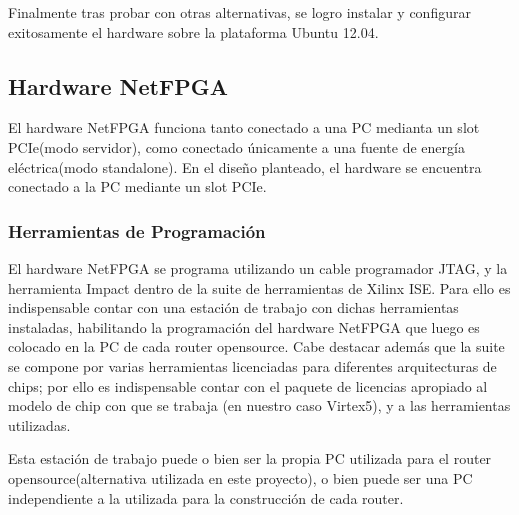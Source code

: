 Finalmente tras probar con otras alternativas, se logro instalar y configurar exitosamente el hardware sobre la plataforma Ubuntu 12.04.\\

\subsection{Hardware NetFPGA}

El hardware NetFPGA funciona tanto conectado a una PC medianta un slot PCIe(modo servidor), como conectado \'unicamente a una fuente de energ\'ia el\'ectrica(modo standalone). En el dise\~no planteado, el hardware se encuentra conectado a la PC mediante un slot PCIe.


\subsubsection{Herramientas de Programaci\'on}

El hardware NetFPGA se programa utilizando un cable programador JTAG, y la herramienta Impact dentro de la suite de herramientas de Xilinx ISE. Para ello es indispensable contar con una estaci\'on de trabajo con dichas herramientas instaladas, habilitando la programaci\'on  del hardware NetFPGA que luego es colocado en la PC de cada router opensource. Cabe destacar adem\'as que la suite se compone por varias herramientas licenciadas para diferentes arquitecturas de chips; por ello es indispensable contar con el paquete de licencias apropiado al modelo de chip con que se trabaja (en nuestro caso Virtex5), y a las herramientas utilizadas. 

Esta estaci\'on de trabajo puede o bien ser la propia PC utilizada para el router opensource(alternativa utilizada en este proyecto), o bien puede ser una PC independiente a la utilizada para la construcci\'on de cada router.\\

